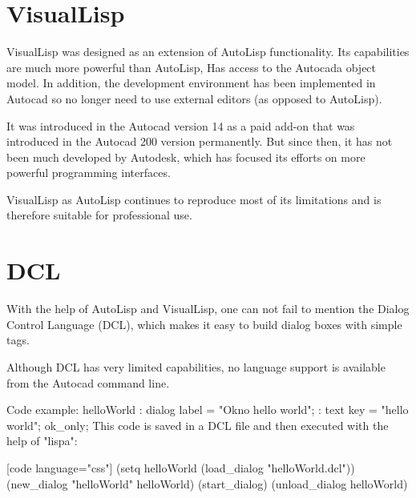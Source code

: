 \documentclass[a4paper, 11pt, article]{report}
\begin{document}
\section{VisualLisp}

VisualLisp was designed as an extension of AutoLisp functionality. Its capabilities are much more powerful than AutoLisp, Has access to the Autocada object model. In addition, the development environment has been implemented in Autocad so no longer need to use external editors (as opposed to AutoLisp).

It was introduced in the Autocad version 14 as a paid add-on that was introduced in the Autocad 200 version permanently. But since then, it has not been much developed by Autodesk, which has focused its efforts on more powerful programming interfaces.

VisualLisp as AutoLisp continues to reproduce most of its limitations and is therefore suitable for professional use.

\section{DCL}
   
   With the help of AutoLisp and VisualLisp, one can not fail to mention the Dialog Control Language (DCL), which makes it easy to build dialog boxes with simple tags.

Although DCL has very limited capabilities, no language support is available from the Autocad command line.

Code example:
\newline
\newline
[code language="css"] helloWorld : dialog { \newline
label = "Okno hello world"; \newline
: text { \newline
key = "hello world"; \newline
} \newline
ok_only; \newline
} \newline
[/code] \newline
This code is saved in a DCL file and then executed with the help of "lispa":

[code language="css"] (setq helloWorld (load_dialog "helloWorld.dcl")) \newline
(new_dialog "helloWorld" helloWorld) \newline
(start_dialog) \newline
(unload_dialog helloWorld) \newline
[/code] \newline
\end{document}
